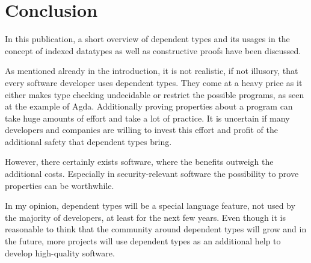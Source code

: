 \section{Conclusion}
In this publication, a short overview of dependent types and its usages in the concept of indexed datatypes as well as constructive proofs have been discussed.

As mentioned already in the introduction, it is not realistic, if not illusory, that every software developer uses dependent types. 
They come at a heavy price as it either makes type checking undecidable or restrict the possible programs, as seen at the example of Agda.
Additionally proving properties about a program can take huge amounts of effort and take a lot of practice.
It is uncertain if many developers and companies are willing to invest this effort and profit of the additional safety that dependent types bring.

However, there certainly exists software, where the benefits outweigh the additional costs. 
Especially in security-relevant software the possibility to prove properties can be worthwhile.

In my opinion, dependent types will be a special language feature, not used by the majority of developers, at least for the next few years. 
Even though it is reasonable to think that the community around dependent types will grow and in the future, more projects will use dependent types as an additional help to develop high-quality software.